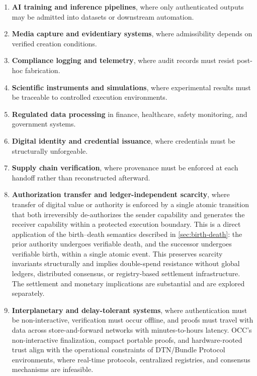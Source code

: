 \documentclass[11pt,letterpaper]{article}
\theoremstyle{occplain}
\theoremstyle{occremark}
\begin{document}
\begin{enumerate}
  \item \textbf{AI training and inference pipelines}, where only authenticated outputs may be admitted into datasets or downstream automation.
  \item \textbf{Media capture and evidentiary systems}, where admissibility depends on verified creation conditions.
  \item \textbf{Compliance logging and telemetry}, where audit records must resist post-hoc fabrication.
  \item \textbf{Scientific instruments and simulations}, where experimental results must be traceable to controlled execution environments.
  \item \textbf{Regulated data processing} in finance, healthcare, safety monitoring, and government systems.
  \item \textbf{Digital identity and credential issuance}, where credentials must be structurally unforgeable.
  \item \textbf{Supply chain verification}, where provenance must be enforced at each handoff rather than reconstructed afterward.
  \item \textbf{Authorization transfer and ledger-independent scarcity}, where transfer of digital value or authority is enforced by a single atomic transition that both irreversibly de-authorizes the sender capability and generates the receiver capability within a protected execution boundary. This is a direct application of the birth--death semantics described in \cref{sec:birth-death}: the prior authority undergoes verifiable death, and the successor undergoes verifiable birth, within a single atomic event. This preserves scarcity invariants structurally and implies double-spend resistance without global ledgers, distributed consensus, or registry-based settlement infrastructure. The settlement and monetary implications are substantial and are explored separately.
  \item \textbf{Interplanetary and delay-tolerant systems}, where authentication must be non-interactive, verification must occur offline, and proofs must travel with data across store-and-forward networks with minutes-to-hours latency. OCC's non-interactive finalization, compact portable proofs, and hardware-rooted trust align with the operational constraints of DTN/Bundle Protocol environments, where real-time protocols, centralized registries, and consensus mechanisms are infeasible.
\end{enumerate}
\end{document}
